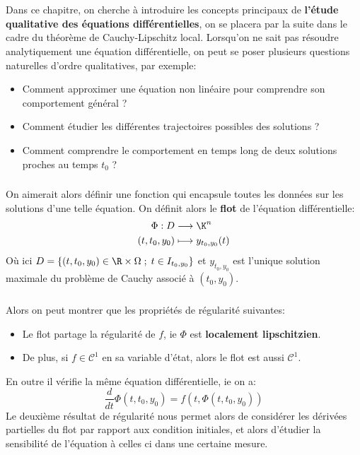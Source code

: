 \chapter*{}
Dans ce chapitre, on cherche à introduire les concepts principaux de \textbf{l'étude qualitative des équations différentielles}, on se placera par la suite dans le cadre du théorème de Cauchy-Lipschitz local. Lorsqu'on ne sait pas résoudre analytiquement une équation différentielle, on peut se poser plusieurs questions naturelles d'ordre qualitatives, par exemple:
\begin{itemize}
   \item Comment approximer une équation non linéaire pour comprendre son comportement général ?
   \item Comment étudier les différentes trajectoires possibles des solutions ?
   \item Comment comprendre le comportement en temps long de deux solutions proches au temps \( t_0 \) ?
\end{itemize}

\subsection*{}
On aimerait alors définir une fonction qui encapsule toutes les données sur les solutions d'une telle équation. On définit alors le \textbf{flot} de l'équation différentielle:
\[ 
   \begin{aligned}
      \Phi : D &\longrightarrow \K^n \\
      (t, t_0, y_0) &\longmapsto y_{t_0, y_0}(t)
   \end{aligned} 
\]
Où ici \( D = \left\{ (t, t_0, y_0) \in \R \times \Omega \; ; \; t \in I_{t_0, y_0} \right\}  \) et \( y_{t_0, y_0} \) est l'unique solution maximale du problème de Cauchy associé à \( (t_0, y_0) \). 
\subsection*{}
Alors on peut montrer que les propriétés de régularité suivantes:
\begin{itemize}
   \item Le flot partage la régularité de \( f \), ie \( \Phi \) est \textbf{localement lipschitzien}.
   \item De plus, si \( f \in \mathcal{C}^1\) en sa variable d'état, alors le flot est aussi \(\mathcal{C}^1\).
\end{itemize}   
En outre il vérifie la même équation différentielle, ie on a:
\[ 
   \frac{d}{dt}\Phi(t, t_0, y_0) = f(t, \Phi(t, t_0, y_0)) 
\]
Le deuxième résultat de régularité nous permet alors de considérer les dérivées partielles du flot par rapport aux condition initiales, et alors d'étudier la sensibilité de l'équation à celles ci dans une certaine mesure.
